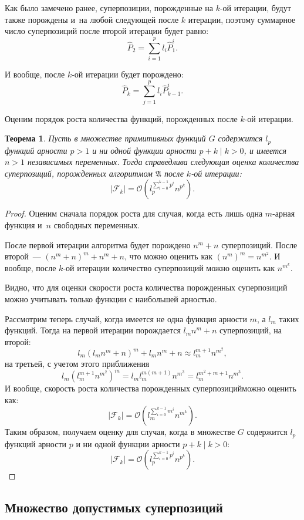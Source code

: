 \documentclass[12pt,a4paper]{amsart}
\newtheorem{theorem}{Теорема}
\begin{document}
Как было замечено ранее, суперпозиции, порожденные на $k$-ой итерации, будут
также порождены и~на любой следующей после $k$ итерации, поэтому суммарное
число суперпозиций после второй итерации будет равно:
\[
\hat{P}_2 = \sum_{i=1}^p l_i \hat{P}_1^i.
\]

И вообще, после $k$-ой итерации будет порождено:
\[
\hat{P}_k = \sum_{j=1}^p l_i \hat{P}_{k-1}^i.
\]

Оценим порядок роста количества функций, порожденных после $k$-ой итерации.

\begin{theorem}
  Пусть в множестве примитивных функций $G$ содержится $l_p$ функций арности
  $p > 1$ и ни одной функции арности $p + k \mid k > 0$, и имеется $n > 1$
  независимых переменных. Тогда справедлива следующая оценка количества
  суперпозиций, порожденных алгоритмом $\mathfrak{A}$ после $k$-ой итерации:
  \[
  | \mathcal{F}_k | = \mathcal{O} (l_p^{\sum_{i=0}^{k-1} p^i} n^{p^k}).
  \]
\end{theorem}
\begin{proof}
  Оценим сначала порядок роста для случая, когда есть лишь одна $m$-арная
  функция и~$n$ свободных переменных.

  После первой итерации алгоритма будет порождено $n^m + n$ суперпозиций.
  После второй~--- $(n^m + n)^m + n^m + n$, что можно оценить как 
  $(n^m)^m = n^{m^2}$. И вообще, после $k$-ой итерации количество
  суперпозиций можно оценить как $n^{m^k}$.

  Видно, что для оценки скорости роста количества порожденных суперпозиций
  можно учитывать только функции с наибольшей арностью.

  Рассмотрим теперь случай, когда имеется не одна функция арности $m$, а
  $l_m$ таких функций. Тогда на первой итерации порождается $l_m n^m + n$
  суперпозиций, на второй:
  \[
  l_m (l_m n^m + n)^m + l_m n^m + n \approx l_m^{m+1} n^{m^2},
  \]
  на третьей, с учетом этого приближения
  \[
  l_m (l_m^{m+1} n^{m^2})^m = l_m l_m^{m(m+1)} n^{m^3} = l_m^{m^2 + m + 1} n^{m^3}.
  \]
  И вообще, скорость роста количества порожденных суперпозицийможно оценить
  как:
  \[
  | \mathcal{F}_k | = \mathcal{O} (l_m^{\sum_{i=0}^{k-1} m^i} n^{m^k}).
  \]
  Таким образом, получаем оценку для случая, когда в множестве $G$ содержится
  $l_p$ функций арности $p$ и ни одной функции арности $p + k \mid k > 0$:
  \[
  | \mathcal{F}_k | = \mathcal{O} (l_p^{\sum_{i=0}^{k-1} p^i} n^{p^k}).
  \]
\end{proof}

\subsection{Множество допустимых суперпозиций}
\end{document}
